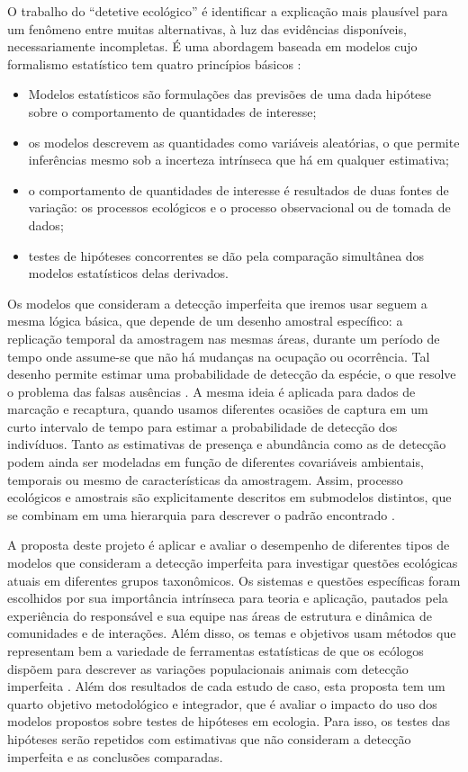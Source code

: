 \documentclass[12pt, A4]{article}
\begin{document}
O trabalho do ``detetive ecológico'' é identificar a explicação mais
plausível para um fenômeno entre muitas alternativas, à luz das
evidências disponíveis, necessariamente incompletas. É uma abordagem
baseada em modelos cujo formalismo estatístico tem quatro princípios
básicos \citep{Hilborn1997,RD2008,kery2012}:
\begin{itemize}
\item Modelos estatísticos são formulações das previsões de uma dada
  hipótese sobre o comportamento de quantidades de interesse;
\item os modelos descrevem as quantidades como variáveis aleatórias, o
  que permite inferências mesmo sob a incerteza intrínseca que há em
  qualquer estimativa;
\item o comportamento de quantidades de interesse é resultados de duas
  fontes de variação: os processos ecológicos e o processo
  observacional ou de tomada de dados;
\item testes de hipóteses concorrentes se dão pela comparação
  simultânea dos modelos estatísticos delas derivados. 
\end{itemize}

Os modelos que consideram a detecção imperfeita que iremos usar seguem
a mesma lógica básica, que depende de um desenho amostral específico:
a replicação temporal da amostragem nas mesmas áreas, durante um
período de tempo onde assume-se que não há mudanças na ocupação ou
ocorrência. Tal desenho permite estimar uma probabilidade de detecção
da espécie, o que resolve o problema das falsas ausências
\citep{mackenzie2002}. 
A mesma ideia é aplicada para dados de
marcação e recaptura, quando usamos diferentes ocasiões de captura em um
curto intervalo de tempo para estimar a probabilidade de detecção dos
indivíduos. Tanto as estimativas de presença e abundância como as de
detecção podem ainda ser modeladas em função de diferentes covariáveis
ambientais, temporais ou mesmo de características da amostragem.
Assim, processo ecológicos e amostrais são explicitamente descritos em
submodelos distintos, que se combinam em uma hierarquia para descrever
o padrão encontrado \citep{RD2008}.

A proposta deste projeto é aplicar e avaliar o desempenho de
diferentes tipos de modelos que consideram a detecção imperfeita para
investigar questões ecológicas atuais em diferentes grupos
taxonômicos. Os sistemas e questões específicas foram escolhidos por
sua importância intrínseca para teoria e aplicação, pautados pela
experiência do responsável e sua equipe nas áreas de estrutura e dinâmica de
comunidades e de interações. Além disso, os temas e objetivos usam
métodos que representam bem a variedade de ferramentas estatísticas
de que os ecólogos dispõem para descrever as variações populacionais
animais com detecção imperfeita \citep[ver][]{williams2002}. Além dos
resultados de cada estudo de caso, esta proposta tem um quarto
objetivo metodológico e integrador, que é avaliar o impacto do uso dos
modelos propostos sobre testes de hipóteses em ecologia. Para isso, os
testes das hipóteses serão repetidos com estimativas que não
consideram a detecção imperfeita e as conclusões comparadas.  
\end{document}
